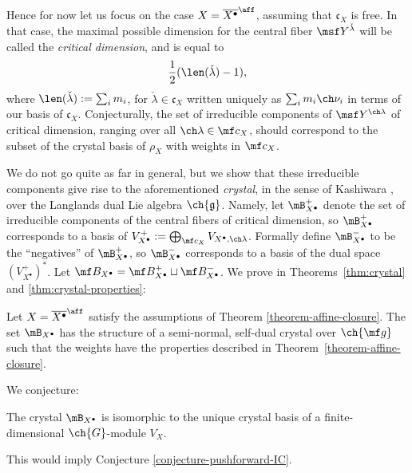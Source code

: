 Hence for now let us focus on the case $X=\overline{X^\bullet}^\aff$, assuming that $\mathfrak c_X$ is free. In that case, the maximal possible dimension for the central fiber $\msf Y^{\check\lambda}$ will be called the \emph{critical dimension}, and is equal to
\[ \frac{1}{2} (\len(\check\lambda)-1),\]
where $\len(\check\lambda) := \sum_i m_i$, for $\check\lambda\in \mathfrak c_X$ written uniquely
as $\sum_i m_i \ch\nu_i$ in terms of our basis of $\mathfrak c_X$.
Conjecturally, the set of irreducible components of $\msf Y^{\ch\lambda}$ of critical dimension,
ranging over all $\ch\lambda \in \mf c_X$, should correspond to the subset
of the crystal basis
of $\rho_X$ with weights in $\mf c_X$.


We do not go quite as far in general, but we show that these irreducible components give rise to the aforementioned \emph{crystal}, in the sense of Kashiwara \cite{Kas93}, over the Langlands dual Lie algebra $\ch{\mathfrak g}$.
Namely, let $\mB_{X^\bullet}^+$ denote the set of irreducible components of
the central fibers of critical dimension, so $\mB_{X^\bullet}^+$ corresponds to a basis
of $V_{X^\bullet}^+ := \bigoplus_{\mf c_X} V_{X^\bullet,\ch\lambda}$.
Formally define $\mB_{X^\bullet}^-$ to be the ``negatives'' of $\mB_{X^\bullet}^+$, so
$\mB_{X^\bullet}^-$ corresponds to a basis of the dual space $(V_{X^\bullet}^+)^*$.
Let $\mf B_{X^\bullet} = \mf B_{X^\bullet}^+ \sqcup \mf B_{X^\bullet}^-$. We prove in
Theorems~\ref{thm:crystal} and \ref{thm:crystal-properties}:

\begin{thm}
\notready
\label{theorem-crystal}
Let $X=\overline{X^\bullet}^\aff$ satisfy the assumptions of Theorem \ref{theorem-affine-closure}. The set $\mB_{X^\bullet}$ has the structure of a semi-normal, self-dual crystal over
$\ch{\mf g}$ such that the weights have the properties described in Theorem~\ref{theorem-affine-closure}.
\end{thm}

We conjecture:

\begin{conj}
\notready
\label{conjecture-crystal}
The crystal $\mB_{X^\bullet}$ is isomorphic to the unique crystal basis
of a finite-dimensional $\ch{G}$-module $V_X$.
\end{conj}
This would imply Conjecture \ref{conjecture-pushforward-IC}.



